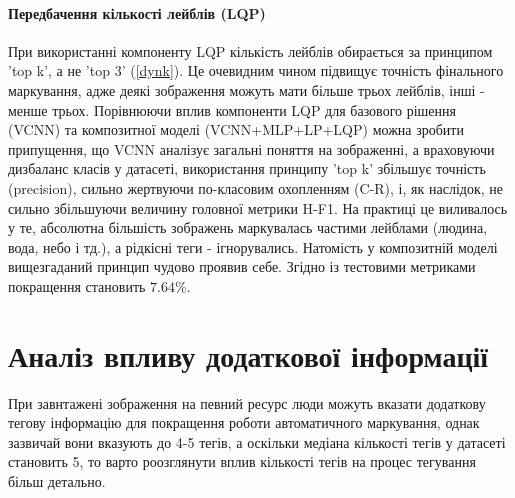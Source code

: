 \documentclass{udstu}
\begin{document}
\paragraph{\textbf{Передбачення кількості лейблів (LQP)}\\}

При використанні компоненту LQP кількість лейблів обирається за принципом 'top k', а не 'top 3' (\ref{dynk}).
Це очевидним чином підвищує точність фінального  маркування, адже деякі зображення можуть мати більше трьох лейблів,
інші - менше трьох. Порівнюючи вплив компоненти LQP для базового рішення (VCNN) та композитної моделі (VCNN+MLP+LP+LQP)
можна зробити припущення, що VCNN аналізує загальні поняття на зображенні, а враховуючи дизбаланс класів у датасеті,
використання принципу 'top k' збільшує точність (precision), сильно жертвуючи по-класовим охопленням (C-R), і,
як наслідок, не сильно збільшуючи величину головної метрики H-F1. На практиці це виливалось у те, абсолютна більшість
зображень маркувалась частими лейблами (людина, вода, небо і тд.), а рідкісні теги - ігнорувались.
Натомість у композитній моделі вищезгаданий принцип чудово проявив себе.
Згідно із тестовими метриками покращення становить $7.64\%$.


\section{Аналіз впливу додаткової інформації}

При завнтажені зображення на певний ресурс люди можуть вказати додаткову тегову інформацію
для покращення роботи автоматичного маркування, однак зазвичай вони вказують до 4-5 тегів,
а оскільки медіана кількості тегів у датасеті становить 5, то варто роозглянути вплив кількості
тегів на процес тегування більш детально.
\end{document}

